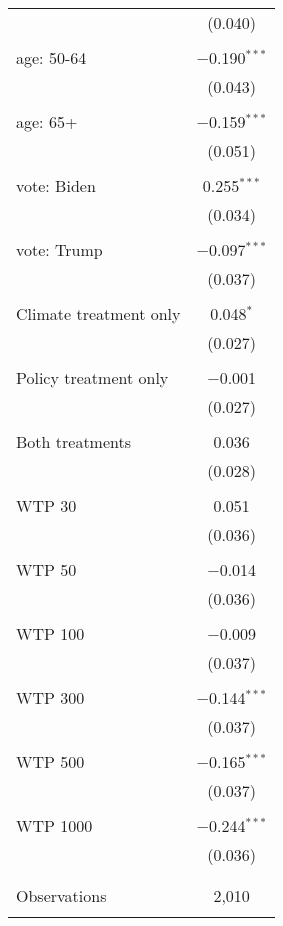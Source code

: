 \begin{tabular}{@{\extracolsep{5pt}}lc}
  & (0.040) \\ 
  & \\ 
 age: 50-64 & $-$0.190$^{***}$ \\ 
  & (0.043) \\ 
  & \\ 
 age: 65+ & $-$0.159$^{***}$ \\ 
  & (0.051) \\ 
  & \\ 
 vote: Biden & 0.255$^{***}$ \\ 
  & (0.034) \\ 
  & \\ 
 vote: Trump & $-$0.097$^{***}$ \\ 
  & (0.037) \\ 
  & \\ 
 Climate treatment only & 0.048$^{*}$ \\ 
  & (0.027) \\ 
  & \\ 
 Policy treatment only & $-$0.001 \\ 
  & (0.027) \\ 
  & \\ 
 Both treatments & 0.036 \\ 
  & (0.028) \\ 
  & \\ 
 WTP 30 & 0.051 \\ 
  & (0.036) \\ 
  & \\ 
 WTP 50 & $-$0.014 \\ 
  & (0.036) \\ 
  & \\ 
 WTP 100 & $-$0.009 \\ 
  & (0.037) \\ 
  & \\ 
 WTP 300 & $-$0.144$^{***}$ \\ 
  & (0.037) \\ 
  & \\ 
 WTP 500 & $-$0.165$^{***}$ \\ 
  & (0.037) \\ 
  & \\ 
 WTP 1000 & $-$0.244$^{***}$ \\ 
  & (0.036) \\ 
  & \\ 
\hline \\[-1.8ex] 

Observations & 2,010 \\ 
\hline 
\hline \\[-1.8ex] 
\end{tabular} 